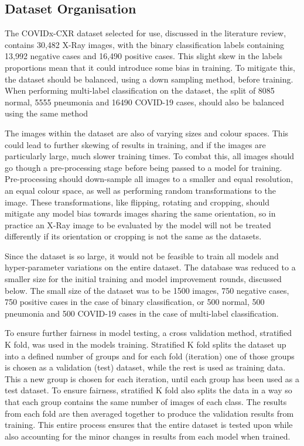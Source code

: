 \subsection{Dataset Organisation}
The COVIDx-CXR dataset selected for use, discussed in the literature review, contains 30,482 X-Ray images, with the binary classification labels containing 13,992 negative cases and 16,490 positive cases. This slight skew in the labels proportions mean that it could introduce some bias in training. To mitigate this, the dataset should be balanced, using a down sampling method, before training. When performing multi-label classification on the dataset, the split of 8085 normal, 5555 pneumonia and 16490 COVID-19 cases, should also be balanced using the same method

The images within the dataset are also of varying sizes and colour spaces. This could lead to further skewing of results in training, and if the images are particularly large, much slower training times. To combat this, all images should go though a pre-processing stage before being passed to a model for training. Pre-processing should down-sample all images to a smaller and equal resolution, an equal colour space, as well as performing random transformations to the image. These transformations, like flipping, rotating and cropping, should mitigate any model bias towards images sharing the same orientation, so in practice an X-Ray image to be evaluated by the model will not be treated differently if its orientation or cropping is not the same as the datasets.

Since the dataset is so large, it would not be feasible to train all models and hyper-parameter variations on the entire dataset. The database was reduced to a smaller size for the initial training and model improvement rounds, discussed below. The small size of the dataset was to be 1500 images, 750 negative cases, 750 positive cases in the case of binary classification, or 500 normal, 500 pneumonia and 500 COVID-19 cases in the case of multi-label classification.

To ensure further fairness in model testing, a cross validation method, stratified K fold, was used in the models training. Stratified K fold splits the dataset up into a defined number of groups and for each fold (iteration) one of those groups is chosen as a validation (test) dataset, while the rest is used as training data. This a new group is chosen for each iteration, until each group has been used as a test dataset. To ensure fairness, stratified K fold also splits the data in a way so that each group contains the same number of images of each class. The results from each fold are then averaged together to produce the validation results from training. This entire process ensures that the entire dataset is tested upon while also accounting for the minor changes in results from each model when trained.

